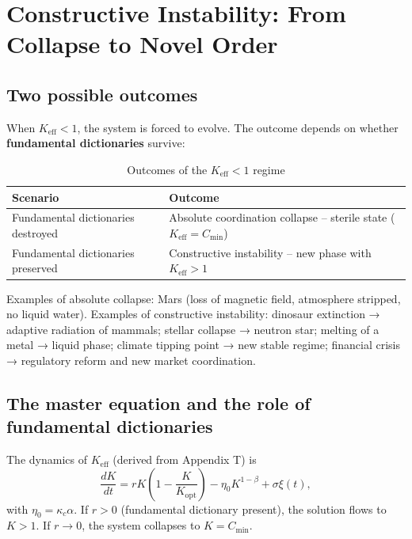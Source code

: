 \documentclass[12pt,a4paper]{article}
\newcommand{\Keff}{K_{\mathrm{eff}}}
\begin{document}
	\section{Constructive Instability: From Collapse to Novel Order}
	
	\subsection{Two possible outcomes}
	
	When $\Keff < 1$, the system is forced to evolve. The outcome depends on whether
	\textbf{fundamental dictionaries} survive:
	
	\begin{table}[H]
		\centering
		\caption{Outcomes of the $\Keff < 1$ regime}
		\begin{tabular}{p{5cm}p{8cm}}
			\toprule
			\textbf{Scenario} & \textbf{Outcome} \\
			\midrule
			Fundamental dictionaries destroyed & Absolute coordination collapse – sterile state ($\Keff = C_{\min}$) \\
			Fundamental dictionaries preserved & Constructive instability – new phase with $\Keff > 1$ \\
			\bottomrule
		\end{tabular}
	\end{table}
	
	Examples of absolute collapse: Mars (loss of magnetic field, atmosphere stripped,
	no liquid water). Examples of constructive instability: dinosaur extinction →
	adaptive radiation of mammals; stellar collapse → neutron star; melting of a metal
	→ liquid phase; climate tipping point → new stable regime; financial crisis →
	regulatory reform and new market coordination.
	
	\subsection{The master equation and the role of fundamental dictionaries}
	
	The dynamics of $\Keff$ (derived from Appendix T) is
	\begin{equation}
		\frac{dK}{dt} = r K\left(1 - \frac{K}{K_{\mathrm{opt}}}\right) - \eta_0 K^{1-\beta} + \sigma \xi(t),
		\label{eq:master}
	\end{equation}
	with $\eta_0 = \kappa_c \alpha$. If $r > 0$ (fundamental dictionary present), the
	solution flows to $K > 1$. If $r \to 0$, the system collapses to $K = C_{\min}$.
	
\end{document}
